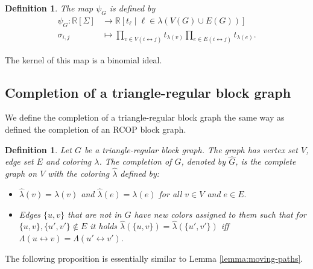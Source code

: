 \documentclass[a4paper, 11pt]{amsart}
\numberwithin{theorem}{section}
\newtheorem{definition}[theorem]{Definition}
\def\R{{\mathbb R}}
\begin{document}
\begin{definition}
    The map $\psi_G$ is defined by 
    \begin{align*}
        \psi_G: \R[\Sigma] &\to \R[t_\ell\mid \ell \in \lambda(V(G)
	\cup E(G))]\\
        \sigma_{i,j}&\mapsto \prod_{v\in V(i\leftrightarrow
	j)}t_{\lambda(v)}  \prod_{e\in E(i\leftrightarrow j)}
	t_{\lambda(e)}.
    \end{align*}
\end{definition}


The kernel of this map is a binomial ideal. 

\subsection{Completion of a triangle-regular block graph}
We define the completion of a triangle-regular block graph the same way as \cite{CMMPS23} defined the completion of an RCOP block graph.
\begin{definition}
    Let $G$ be a triangle-regular block graph. The graph has vertex set $V$, edge set $E$ and coloring  $\lambda $. The  \emph{completion} of $G$, denoted by $\hat G$, is the complete graph on $V$ with the coloring $\hat{\lambda}$ defined by:
    \begin{itemize}
        \item $\hat{\lambda } (v) = \lambda (v) $ and $\hat{\lambda} (e) = \lambda (e) $ for all $v \in V$
        and $e \in E.$
        \item Edges $\{u,v\}$ that are not in $G$ have new colors assigned to them such that for \newline
        $\{u,v\}, \{u',v'\} \not \in E$ it holds $\hat{\lambda } (\{u,v\}) = \hat{\lambda } (\{u',v'\})$ iff $\Lambda (u \leftrightarrow v) = \Lambda (u'\leftrightarrow v').$ 
    \end{itemize}
\end{definition}

The following proposition is essentially similar to Lemma \ref{lemma:moving-paths}.
\end{document}
